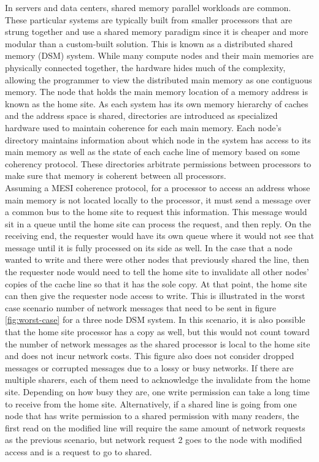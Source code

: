     In servers and data centers, shared memory parallel workloads are common. These particular systems are typically built from smaller processors that are strung together and use a shared memory paradigm since it is cheaper and more modular than a custom-built solution. This is known as a distributed shared memory (DSM) system. While many compute nodes and their main memories are physically connected together, the hardware hides much of the complexity, allowing the programmer to view the distributed main memory as one contiguous memory. The node that holds the main memory location of a memory address is known as the home site. As each system has its own memory hierarchy of caches and the address space is shared, directories are introduced as specialized hardware used to maintain coherence for each main memory. Each node's directory maintains information about which node in the system has access to its main memory as well as the state of each cache line of memory based on some coherency protocol. These directories arbitrate permissions between processors to make sure that memory is coherent between all processors. \\

    Assuming a MESI coherence protocol, for a processor to access an address whose main memory is not located locally to the processor, it must send a message over a common bus to the home site to request this information. This message would sit in a queue until the home site can process the request, and then reply. On the receiving end, the requester would have its own queue where it would not see that message until it is fully processed on its side as well. In the case that a node wanted to write and there were other nodes that previously shared the line, then the requester node would need to tell the home site to invalidate all other nodes' copies of the cache line so that it has the sole copy. At that point, the home site can then give the requester node access to write. This is illustrated in the worst case scenario number of network messages that need to be sent in figure \ref{fig:worst-case} for a three node DSM system. In this scenario, it is also possible that the home site processor has a copy as well, but this would not count toward the number of network messages as the shared processor is local to the home site and does not incur network costs. This figure also does not consider dropped messages or corrupted messages due to a lossy or busy networks. If there are multiple sharers, each of them need to acknowledge the invalidate from the home site. Depending on how busy they are, one write permission can take a long time to receive from the home site. Alternatively, if a shared line is going from one node that has write permission to a shared permission with many readers, the first read on the modified line will require the same amount of network requests as the previous scenario, but network request 2 goes to the node with modified access and is a request to go to shared. \\

